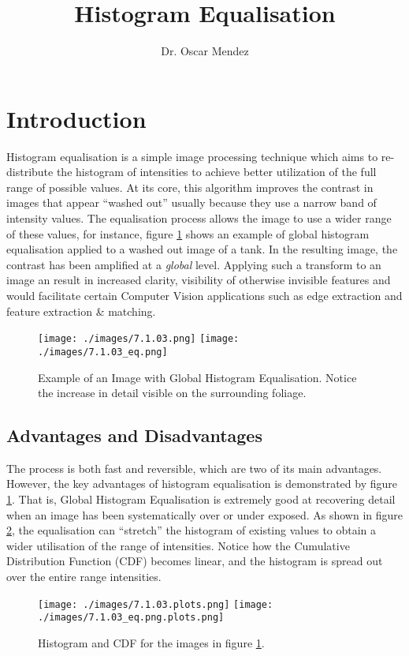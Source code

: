 \documentclass{article}
\title{Histogram Equalisation}
\author{Dr. Oscar Mendez}
\begin{document}
\maketitle

\section{Introduction}


Histogram equalisation is a simple image processing technique which aims to re-distribute the histogram of intensities to achieve better utilization of the full range of possible values. 
At its core, this algorithm improves the contrast in images that appear “washed out” usually because they use a narrow band of intensity values. 
The equalisation process allows the image to use a wider range of these values, for instance, figure \ref{fig:tank} shows an example of global histogram equalisation applied to a washed out image of a tank. In the resulting image, the contrast has been amplified at a \textit{global} level.  Applying such a transform to an image an result in increased clarity, visibility of otherwise invisible features and would facilitate certain Computer Vision applications such as edge extraction and feature extraction \& matching. 

\begin{figure}[h]
    \centering
    \texttt{[image: ./images/7.1.03.png]}
    \texttt{[image: ./images/7.1.03\_eq.png]}
    \caption{\label{fig:tank}Example of an Image with Global Histogram Equalisation. Notice the increase in detail visible on the surrounding foliage.}
\end{figure}

\subsection{Advantages and Disadvantages}
The process is both fast and reversible, which are two of its main advantages. 
However, the key advantages of histogram equalisation is demonstrated by figure \ref{fig:tank}. 
That is, Global Histogram Equalisation is extremely good at recovering detail when an image has been systematically over or under exposed. 
As shown in figure \ref{fig:tankplots}, the equalisation can ``stretch'' the histogram of existing values to obtain a wider utilisation of the range of intensities. 
Notice how the Cumulative Distribution Function (CDF) becomes linear, and the histogram is spread out over the entire range intensities.
\begin{figure}
    \centering
    \texttt{[image: ./images/7.1.03.plots.png]}
    \texttt{[image: ./images/7.1.03\_eq.png.plots.png]}
    \caption{\label{fig:tankplots}Histogram and CDF for the images in figure \ref{fig:tank}.}
\end{figure}
\end{document}
